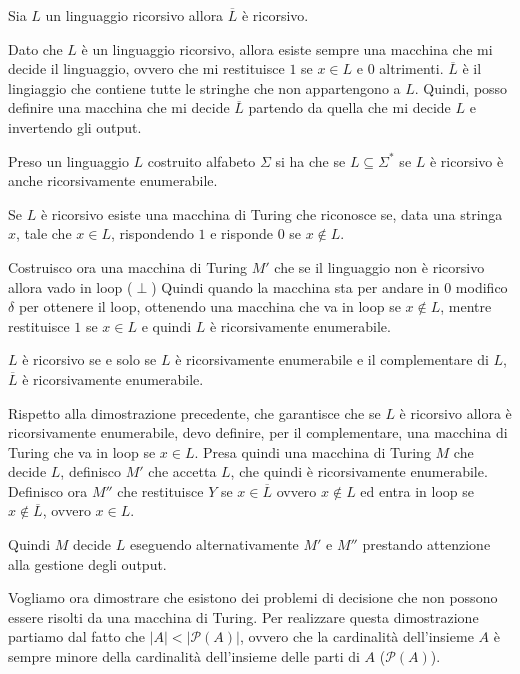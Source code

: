 \begin{teorema}
    Sia $L$ un linguaggio ricorsivo allora $\overline{L}$ è ricorsivo.
\end{teorema}
\begin{dimostrazione}
    Dato che $L$ è un linguaggio ricorsivo, allora esiste sempre una macchina che
    mi decide il linguaggio, ovvero che mi restituisce $1$ se $x \in L$ e $0$ altrimenti.
    $\overline{L}$ è il lingiaggio che contiene tutte le stringhe che non appartengono
    a $L$. Quindi, posso definire una macchina che mi decide $\overline{L}$
    partendo da quella che mi decide $L$ e invertendo gli output.
\end{dimostrazione}
\begin{teorema}
    Preso un linguaggio $L$ costruito alfabeto $\Sigma$ si ha che se
    $L \subseteq \Sigma^{\ast}$ se $L$ è ricorsivo è anche ricorsivamente enumerabile.
\end{teorema}
\begin{dimostrazione}
    Se $L$ è ricorsivo esiste una macchina di Turing che riconosce se, data una
    stringa $x$, tale che $x \in L$, rispondendo $1$ e risponde $0$ se $x \notin L$.

    Costruisco ora una macchina di Turing $M'$ che se il linguaggio non è ricorsivo
    allora vado in loop ($\perp$) Quindi quando la macchina sta per andare in $0$
    modifico $\delta$ per ottenere il loop, ottenendo una macchina che va in loop
    se $x \notin L$, mentre restituisce $1$ se $x \in L$ e quindi $L$ è
    ricorsivamente enumerabile.
\end{dimostrazione}
\begin{teorema}
    $L$ è ricorsivo se e solo se $L$ è ricorsivamente enumerabile e il complementare
    di $L$, $\overline{L}$ è ricorsivamente enumerabile.
\end{teorema}
\begin{dimostrazione}
    Rispetto alla dimostrazione precedente, che garantisce che se $L$ è ricorsivo
    allora è ricorsivamente enumerabile, devo definire, per il complementare,
    una macchina di Turing che va in loop se $x \in L$.
    Presa quindi una macchina di Turing $M$ che decide $L$, definisco $M'$ che
    accetta $L$, che quindi è ricorsivamente enumerabile. Definisco ora $M''$ che
    restituisce $Y$ se $x \in \overline{L}$ ovvero $x \notin L$ ed entra in loop
    se $x \notin \overline{L}$, ovvero $x \in L$.

    Quindi $M$ decide $L$ eseguendo alternativamente $M'$ e $M''$ prestando
    attenzione alla gestione degli output.
\end{dimostrazione}
Vogliamo ora dimostrare che esistono dei problemi di decisione che non possono
essere risolti da una macchina di Turing. Per realizzare questa dimostrazione
partiamo dal fatto che $|A| < |\mathcal{P}(A)|$, ovvero che la cardinalità dell'insieme
$A$ è sempre minore della cardinalità dell'insieme delle parti di $A$ ($\mathcal{P}(A)$).

